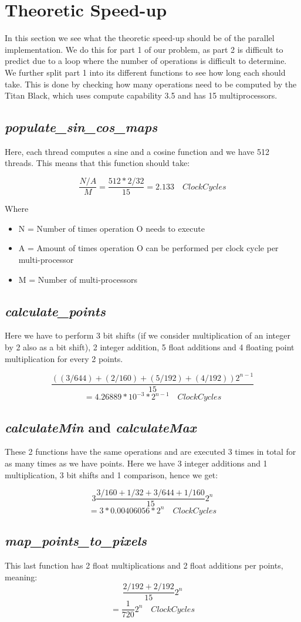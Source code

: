 \section{Theoretic Speed-up}
In this section we see what the theoretic speed-up should be of the parallel implementation. We do this for part 1 of our problem, as part 2 is difficult to predict due to a loop where the number of operations is difficult to determine. We further split part 1 into its different functions to see how long each should take. This is done by checking how many operations need to be computed by the Titan Black, which uses compute capability 3.5 and has 15 multiprocessors.

\subsection{\textit{populate\_sin\_cos\_maps}}
Here, each thread computes a sine and a cosine function and we have 512 threads. This means that this function should take:

\[\frac{N/A}{M} = \frac{512 * 2 / 32} {15} = 2.133 \quad ClockCycles\]

Where 
\begin{itemize}
	\item N = Number of times operation O needs to execute
	\item A = Amount of times operation O can be performed per clock cycle per multi-processor
	\item M = Number of multi-processors
\end{itemize}

\subsection{\textit{calculate\_points}}
Here we have to perform 3 bit shifts (if we consider multiplication of an integer by 2 also as a bit shift), 2 integer addition, 5 float additions and 4 floating point multiplication for every 2 points.

\[ \frac{((3/644) + (2/160) + (5/192) + (4/192))2^{n-1}}{15} \]
\[=4.26889*10^{-3}*2^{n-1} \quad ClockCycles\]

\subsection{\textit{calculateMin} and \textit{calculateMax}}
These 2 functions have the same operations and are executed 3 times in total for as many times as we have points. Here we have 3 integer additions and 1 multiplication, 3 bit shifts and 1 comparison, hence we get:

\[3\frac{3/160 + 1/32 + 3/644 + 1/160}{15}2^{n}\]
\[=3*0.00406056*2^n \quad ClockCycles\]

\subsection{\textit{map\_points\_to\_pixels}}
This last function has 2 float multiplications and 2 float additions per points, meaning:
\[\frac{2/192 + 2/192}{15}2^{n}\]
\[=\frac{1}{720}2^n \quad ClockCycles\]